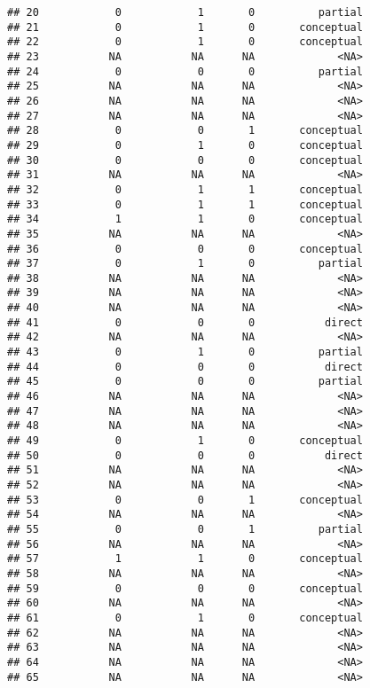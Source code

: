 \documentclass[
  english,
  man]{apa6}
\begin{document}
\begin{verbatim}
## 20            0            1       0          partial
## 21            0            1       0       conceptual
## 22            0            1       0       conceptual
## 23           NA           NA      NA             <NA>
## 24            0            0       0          partial
## 25           NA           NA      NA             <NA>
## 26           NA           NA      NA             <NA>
## 27           NA           NA      NA             <NA>
## 28            0            0       1       conceptual
## 29            0            1       0       conceptual
## 30            0            0       0       conceptual
## 31           NA           NA      NA             <NA>
## 32            0            1       1       conceptual
## 33            0            1       1       conceptual
## 34            1            1       0       conceptual
## 35           NA           NA      NA             <NA>
## 36            0            0       0       conceptual
## 37            0            1       0          partial
## 38           NA           NA      NA             <NA>
## 39           NA           NA      NA             <NA>
## 40           NA           NA      NA             <NA>
## 41            0            0       0           direct
## 42           NA           NA      NA             <NA>
## 43            0            1       0          partial
## 44            0            0       0           direct
## 45            0            0       0          partial
## 46           NA           NA      NA             <NA>
## 47           NA           NA      NA             <NA>
## 48           NA           NA      NA             <NA>
## 49            0            1       0       conceptual
## 50            0            0       0           direct
## 51           NA           NA      NA             <NA>
## 52           NA           NA      NA             <NA>
## 53            0            0       1       conceptual
## 54           NA           NA      NA             <NA>
## 55            0            0       1          partial
## 56           NA           NA      NA             <NA>
## 57            1            1       0       conceptual
## 58           NA           NA      NA             <NA>
## 59            0            0       0       conceptual
## 60           NA           NA      NA             <NA>
## 61            0            1       0       conceptual
## 62           NA           NA      NA             <NA>
## 63           NA           NA      NA             <NA>
## 64           NA           NA      NA             <NA>
## 65           NA           NA      NA             <NA>

\end{verbatim}
\end{document}
